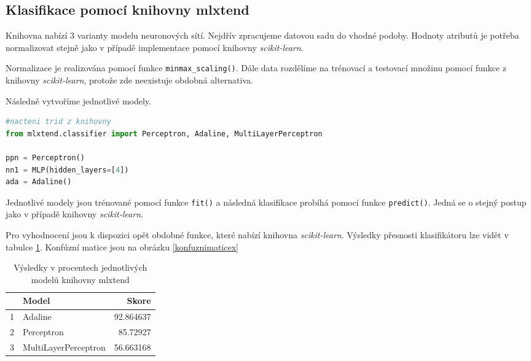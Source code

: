 \subsection*{Klasifikace pomocí knihovny mlxtend}
Knihovna nabízí 3 varianty modelu neuronových sítí. Nejdřív zpracujeme datovou sadu do vhodné podoby. Hodnoty atributů je potřeba normalizovat stejně jako v případě implementace pomocí knihovny \textit{scikit-learn}.  

Normalizace je realizována pomocí funkce \verb|minmax_scaling()|. Dále data rozdělíme na trénovací a testovací množinu pomocí funkce z knihovny \textit{scikit-learn}, protože zde neexistuje obdobná alternativa.

Následně vytvoříme jednotlivé modely. 

\begin{mdframed}
\begin{lstlisting}[language=Python]
#nacteni trid z knihovny
from mlxtend.classifier import Perceptron, Adaline, MultiLayerPerceptron

ppn = Perceptron()
nn1 = MLP(hidden_layers=[4])
ada = Adaline()
\end{lstlisting}   
\end{mdframed}

Jednotlivé modely jsou trénované pomocí funkce \verb|fit()| a následná klasifikace probíhá pomocí funkce \verb|predict()|. Jedná se o stejný postup jako v případě knihovny \textit{scikit-learn}. 

Pro vyhodnocení jsou k dispozici opět obdobné funkce, které nabízí knihovna \textit{scikit-learn}. Výsledky přesnosti klasifikátoru lze vidět v tabulce \ref{tab5}. Konfúzní matice jsou na obrázku \ref{konfuznimaticex}

\begin{table}[]
    \centering
    \begin{tabular}{llr}
\toprule
{} &                    Model &      Skore \\
\midrule
1 &             Adaline &  92.864637 \\
2 &             Perceptron &  85.72927 \\
3 &  MultiLayerPerceptron &  56.663168 \\
\bottomrule
\end{tabular}
    \caption{Výsledky v procentech jednotlivých modelů knihovny mlxtend}
    \label{tab5}
\end{table}

